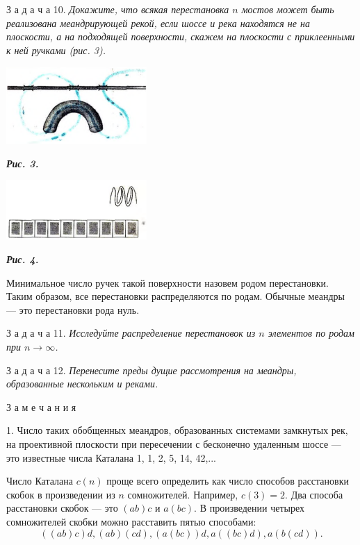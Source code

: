 \documentclass[Main.tex]{subfiles}
\begin{document}
\begin{multicols}{2}
З а д а ч а 10. \textit{Докажите, что всякая перестановка $n$ мостов может быть реализована меандрирующей рекой, если шоссе и река находятся не на плоскости, а на подходящей поверхности, скажем на плоскости с приклеенными к ней ручками (рис. 3).}

\includegraphics[width=0.4\textwidth]{../images/Picture3}

\begin{flushleft}\textbf{\textit{\small{Рис. 3.}}}\end{flushleft}

\includegraphics[width=0.4\textwidth]{../images/Picture4}

\begin{flushleft}\textbf{\textit{\small{Рис. 4.}}}\end{flushleft}

Минимальное число ручек такой поверхности назовем родом перестановки. Таким образом, все перестановки распределяются по родам. Обычные меандры — это перестановки рода нуль.

З а д а ч а 11. \textit{Исследуйте распределение перестановок из $n$ элементов по родам при $n \rightarrow \infty$.}

З а д а ч а 12. \textit{Перенесите преды дущие рассмотрения на меандры, образованные нескольким и реками.}

З а м е ч а н и я

1. Число таких обобщенных меандров, образованных системами замкнутых рек, на проективной плоскости при пересечении с бесконечно удаленным шоссе — это известные числа Каталана 1, 1, 2, 5, 14, 42,...

Число Каталана $c(n)$ проще всего определить как число способов расстановки скобок в произведении из $n$ сомножителей. Например, $c(3) = 2$. Два способа расстановки скобок — это $(ab)c$ и $a(bc)$. В произведении четырех сомножителей скобки можно расставить пятью способами:
$$
((ab)c)d, (ab)(cd), (a(bc))d, a((bc)d), a(b(cd)).
$$


\end{multicols}
\end{document}

